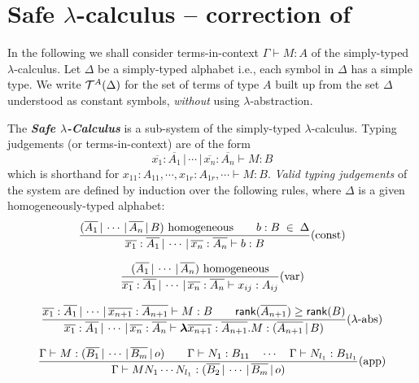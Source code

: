 \documentclass{article}
\newcommand\textbfit[1]{{\bf\em #1}\index{#1}}
\newcommand\seq[2]{{{#1} \vdash {#2}}}
\newcommand\blambda{\hbox{\boldmath $\lambda$}}
\newcommand\lterm[2]{{\blambda{#1}.{#2}}}
\newcommand\terms[2]{{\cal T}^{#1}(#2)}
\theoremstyle{definition}
\theoremstyle{remark}
\newcommand\rank[1]{{\sf rank}(#1)}
\begin{document}
\section{Safe $\lambda$-calculus -- correction of \cite{DBLP:conf/fossacs/AehligMO05}}

In the following we shall consider terms-in-context $\seq{\Gamma}{M
: A}$ of the simply-typed $\lambda$-calculus. Let $\Delta$ be a
simply-typed alphabet i.e., each symbol in $\Delta$ has a simple
type. We write $\terms{A}{\Delta}$ for the set of terms of type $A$
built up from the set $\Delta$ understood as constant symbols,
\emph{without} using $\lambda$-abstraction.


The \textbfit{Safe $\lambda$-Calculus} is a sub-system of the
simply-typed $\lambda$-calculus. Typing judgements (or
terms-in-context) are of the form
\begin{equation}
\nonumber \seq{\overline{x_1}:\overline{A_1} \, | \, \cdots \, | \,
\overline{x_n} :  \overline{A_n}}{M : B}
\end{equation}
which is shorthand for $\seq{x_{11} : A_{11}, \cdots, x_{1r}:
A_{1r}, \cdots}{M : B}$. \emph{Valid typing judgements} of the
system are defined by induction over the following rules, where
$\Delta$ is a given homogeneously-typed alphabet:
\[{{(\overline{A_1} \, | \, \cdots \, | \, \overline{A_n} \, | \, B)
\hbox{ homogeneous} \qquad {b : B} \; \in \; \Delta} \over
{\seq{\overline{x_1} : \overline{A_1}\, | \, \cdots\, | \,
\overline{x_n} : \overline{A_n}}{b : B}}}(\mbox{const})\]

\[{{(\overline{A_1}
\, | \, \cdots \, | \, \overline{A_n}) \hbox{ homogeneous}} \over
{\seq{\overline{x_1} : \overline{A_1}\, | \, \cdots\, | \,
\overline{x_n} : \overline{A_n}}{x_{ij} : A_{ij}}}}(\mbox{var})\]

\[
{ {\seq{\overline{x_1} : \overline{A_1}\, | \, \cdots\, | \,
\overline{x_{n+1}} : \overline{A_{n+1}}}{M : B}} \qquad
\rank{\overline{A_{n+1}}} \geq \rank{B} \over {\seq{\overline{x_1} :
\overline{A_1}\, | \, \cdots\, | \, \overline{x_{n}} :
\overline{A_{n}}}{\lterm{\overline{x_{n+1}} : \overline{A_{n+1}}}{M}
: (\overline{A_{n+1}} \, | \, B)}} } (\mbox{$\lambda$-abs})\]

\[ {{\seq{\Gamma}{M : (\overline{B_1} \, | \, \cdots \, | \, \overline{B_m} \, | \, o)} \qquad
\seq{\Gamma}{N_1 : B_{11}} \quad \cdots \quad \seq{\Gamma}{N_{l_1} :
B_{1l_1}} }\over{ \seq{\Gamma}{M N_1 \cdots N_{l_1} :
(\overline{B_2} \, | \, \cdots \, | \, \overline{B_m} \, | \, o)}}}
(\mbox{app})\]
\end{document}
